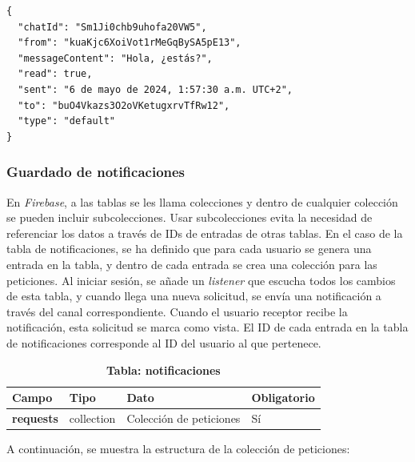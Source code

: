\documentclass[a4paper, 12pt]{article}
\begin{document}
\begin{verbatim}
{
  "chatId": "Sm1Ji0chb9uhofa20VW5",
  "from": "kuaKjc6XoiVot1rMeGqBySA5pE13",
  "messageContent": "Hola, ¿estás?",
  "read": true,
  "sent": "6 de mayo de 2024, 1:57:30 a.m. UTC+2",
  "to": "buO4Vkazs3O2oVKetugxrvTfRw12",
  "type": "default"
}
\end{verbatim}


\subsubsection{Guardado de notificaciones}

En \textit{Firebase}, a las tablas se les llama colecciones y dentro de cualquier colección se pueden incluir subcolecciones. Usar subcolecciones evita la necesidad de referenciar los datos a través de IDs de entradas de otras tablas. En el caso de la tabla de notificaciones, se ha definido que para cada usuario se genera una entrada en la tabla, y dentro de cada entrada se crea una colección para las peticiones. Al iniciar sesión, se añade un \textit{listener} que escucha todos los cambios de esta tabla, y cuando llega una nueva solicitud, se envía una notificación a través del canal correspondiente. Cuando el usuario receptor recibe la notificación, esta solicitud se marca como vista. El ID de cada entrada en la tabla de notificaciones corresponde al ID del usuario al que pertenece.

\begin{table}[H]
\captionsetup{justification=raggedright,singlelinecheck=false}
\captionsetup{labelformat=empty}
\caption{\textbf{Tabla: notificaciones}}
\label{tab:notifications}
	\begin{tabular}{|m{3.2cm}|m{2cm}|m{5cm}|m{3cm}|}
	\hline
	\textbf{Campo} & \textbf{Tipo} & \textbf{Dato} & \textbf{Obligatorio} \\ 
	\hline
	\textbf{requests} & collection & Colección de peticiones &  Sí \\ 
	\hline
	\end{tabular}
\end{table}

A continuación, se muestra la estructura de la colección de peticiones:
\end{document}
